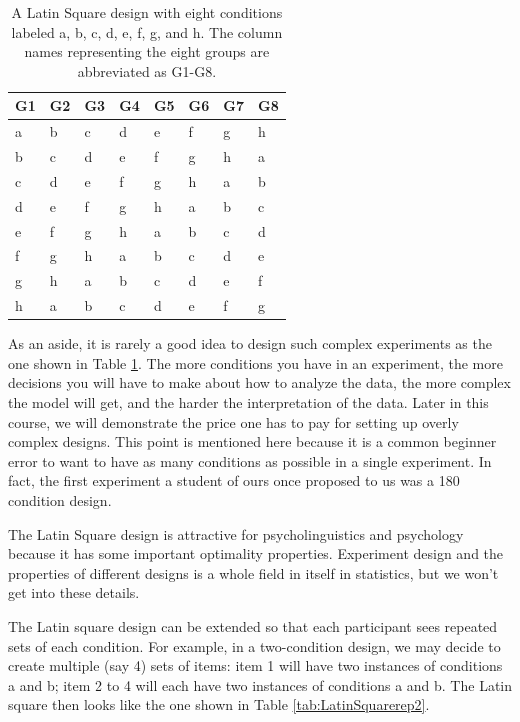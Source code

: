 \documentclass[
  12pt,
]{krantz}
\theoremstyle{definition}
\theoremstyle{definition}
\theoremstyle{definition}
\theoremstyle{definition}
\theoremstyle{remark}
\begin{document}
\begin{table}

\caption{\label{tab:LatinSquare8}A Latin Square design with eight conditions labeled a, b, c, d, e, f, g, and h. The column names representing the eight groups are abbreviated as G1-G8.}
\centering
\begin{tabular}[t]{llllllll}
\toprule
G1 & G2 & G3 & G4 & G5 & G6 & G7 & G8\\
\midrule
a & b & c & d & e & f & g & h\\
b & c & d & e & f & g & h & a\\
c & d & e & f & g & h & a & b\\
d & e & f & g & h & a & b & c\\
e & f & g & h & a & b & c & d\\
\addlinespace
f & g & h & a & b & c & d & e\\
g & h & a & b & c & d & e & f\\
h & a & b & c & d & e & f & g\\
\bottomrule
\end{tabular}
\end{table}

As an aside, it is rarely a good idea to design such complex experiments as the one shown in Table \ref{tab:LatinSquare8}. The more conditions you have in an experiment, the more decisions you will have to make about how to analyze the data, the more complex the model will get, and the harder the interpretation of the data. Later in this course, we will demonstrate the price one has to pay for setting up overly complex designs. This point is mentioned here because it is a common beginner error to want to have as many conditions as possible in a single experiment. In fact, the first experiment a student of ours once proposed to us was a 180 condition design.

The Latin Square design is attractive for psycholinguistics and psychology because it has some important optimality properties. Experiment design and the properties of different designs is a whole field in itself in statistics, but we won't get into these details.

The Latin square design can be extended so that each participant sees repeated sets of each condition. For example, in a two-condition design, we may decide to create multiple (say 4) sets of items: item 1 will have two instances of conditions a and b; item 2 to 4 will each have two instances of conditions a and b. The Latin square then looks like the one shown in Table \ref{tab:LatinSquarerep2}.
\end{document}
